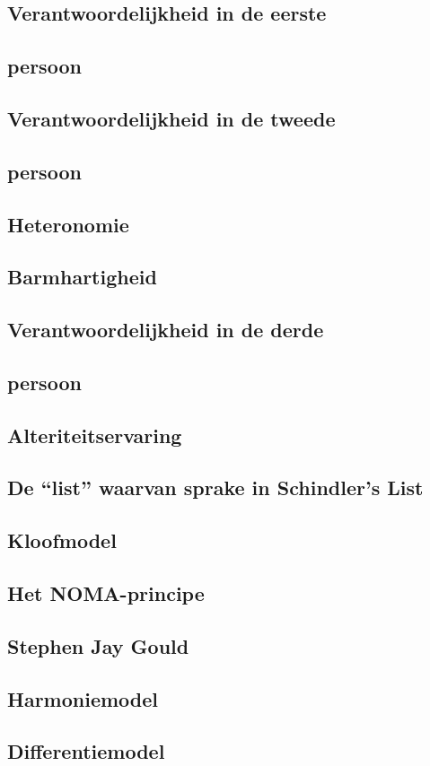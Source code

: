 \documentclass[main.tex]{subfiles}
\begin{document}
\subsection*{Verantwoordelijkheid in de eerste}
\subsection*{persoon}
\subsection*{Verantwoordelijkheid in de tweede}
\subsection*{persoon}
\subsection*{Heteronomie}
\subsection*{Barmhartigheid}
\subsection*{Verantwoordelijkheid in de derde}
\subsection*{persoon}
\subsection*{Alteriteitservaring}
\subsection*{De “list” waarvan sprake in Schindler’s List}
\subsection*{Kloofmodel}
\subsection*{Het NOMA-principe}
\subsection*{Stephen Jay Gould}
\subsection*{Harmoniemodel}
\subsection*{Differentiemodel}
\end{document}

